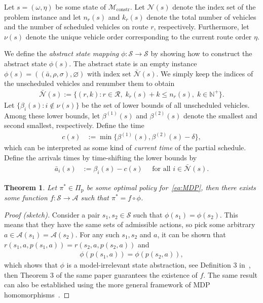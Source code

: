 \documentclass{report}
\theoremstyle{definition}
\theoremstyle{plain}
\newtheorem{theorem}{Theorem}[chapter]
\begin{document}
Let $s = (\omega, \eta)$ be some state of $\mathcal{M}_\mathrm{constr}$.
Let $\mathcal{N}(s)$ denote the index set of the problem instance and let
$n_r(s)$ and $k_r(s)$ denote the total number of vehicles and the number of
scheduled vehicles on route $r$, respectively. Furthermore, let $\nu(s)$ denote
the unique vehicle order corresponding to the current route order $\eta$.

We define the \emph{abstract state mapping} $\phi : \mathcal{S} \rightarrow \mathcal{S}$ by showing
how to construct the abstract state $\phi(s)$.
%
The abstract state is an empty instance
$\phi(s) = ((\bar{a}, \rho, \sigma), \varnothing)$ with index set
$\bar{\mathcal{N}}(s)$.
%
We simply keep the indices of the unscheduled vehicles and renumber them to
obtain
\begin{align}
  \bar{\mathcal{N}}(s) := \{ (r,k) : r \in \mathcal{R}, \; k_r(s) + k \leq n_r(s), \; k\in\mathbb{N}^+ \} .
\end{align}
%
Let $\{ \beta_i(s) : i \notin \nu(s) \}$ be the set of lower bounds of all
unscheduled vehicles. Among these lower bounds, let $\beta^{(1)}(s)$ and
$\beta^{(2)}(s)$ denote the smallest and second smallest, respectively.
%
Define the time
\begin{align}
  c(s) &:= \min \{ \beta^{(1)}(s), \beta^{(2)}(s) - \delta \} ,
\end{align}
%
which can be interpreted as some kind of \emph{current time} of the
partial schedule.
Define the arrivals times by time-shifting the lower bounds by
\begin{align}
  \bar{a}_i(s) &:= \beta_i(s) - c(s) \quad \text{ for all } i \in \bar{\mathcal{N}}(s) .
\end{align}

\begin{theorem}
  Let $\pi^* \in \Pi_\mathrm{p}$ be some optimal policy for~\eqref{eq:MDP}, then
  there exists some function $f : \mathcal{S} \rightarrow \mathcal{A}$ such that
  $\pi^* = f \circ \phi$.
\end{theorem}
\begin{proof}[Proof (sketch)]
  Consider a pair $s_1, s_2 \in \mathcal{S}$ such that $\phi(s_1) = \phi(s_2)$. This means that they have the same sets of admissible actions, so pick some arbitrary $a \in \mathcal{A}(s_1) = \mathcal{A}(s_2)$.
  For any such $s_1, s_2$ and $a$, it can be shown that
  $r(s_1, a, p(s_1, a)) = r(s_2, a, p(s_2, a))$ and
  \begin{align*}
    \phi(p(s_1, a)) = \phi(p(s_2, a)) ,
  \end{align*}
  which shows that $\phi$ is a model-irrelevant state abstraction, see
  Definition 3 in~\cite{liUnifiedTheoryState2006}, then Theorem 3 of the same paper
  guarantees the existence of $f$. The same result can also be established using
  the more general framework of MDP
  homomorphisms~\cite{ravindran2001symmetries}.
\end{proof}
\end{document}
